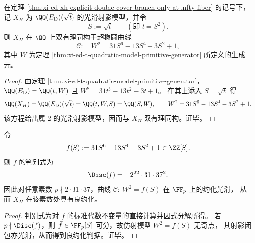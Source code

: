 \begin{theorem}\label{thm:xi-ed-xh-hyperelliptic-model-explicit}
在定理 \ref{thm:xi-ed-xh-explicit-double-cover-branch-only-at-infty-fiber} 的记号下，记 \(X_H\) 为 \(\QQ(E_{\mathrm D})(\sqrt{t})\) 的光滑射影模型，并令
\[
S:=\sqrt{t}\qquad(\text{即 }t=S^2).
\]
则 \(X_H\) 在 \(\QQ\) 上双有理同构于超椭圆曲线
\[
\mathcal C:\quad W^2=31S^6-13S^4-3S^2+1,
\]
其中 \(W\) 为定理 \ref{thm:xi-ed-t-quadratic-model-primitive-generator} 所定义的生成元。
\end{theorem}
\begin{proof}
由定理 \ref{thm:xi-ed-t-quadratic-model-primitive-generator}，
\(
\QQ(E_{\mathrm D})=\QQ(t,W)
\)
且 \(W^2=31t^3-13t^2-3t+1\)。
在其上添入 \(S=\sqrt{t}\) 得
\[
\QQ(X_H)
=\QQ(E_{\mathrm D})(\sqrt{t})
=\QQ(t,W,S)
=\QQ(S,W),
\qquad
W^2=31S^6-13S^4-3S^2+1.
\]
该方程给出属 \(2\) 的光滑射影模型，因而与 \(X_H\) 双有理同构。证毕。
\end{proof}

\begin{corollary}\label{cor:xi-ed-xh-hyperelliptic-discriminant-good-reduction}
令
\[
f(S):=31S^6-13S^4-3S^2+1\in\ZZ[S].
\]
则 \(f\) 的判别式为
\[
\Disc(f)=-2^{22}\cdot 31\cdot 37^{2}.
\]
因此对任意素数 \(p\nmid 2\cdot 31\cdot 37\)，曲线 \(\mathcal C:\ W^2=f(S)\) 在 \(\FF_p\) 上的约化光滑，
从而 \(X_H\) 在该素数处具有良约化。
\end{corollary}
\begin{proof}
判别式为对 \(f\) 的标准代数不变量的直接计算并因式分解所得。
若 \(p\nmid \Disc(f)\)，则 \(\bar f\in \FF_p[S]\) 可分，故仿射模型 \(W^2=\bar f(S)\) 无奇点，
其射影闭包亦光滑，从而得到良约化判据。证毕。
\end{proof}

